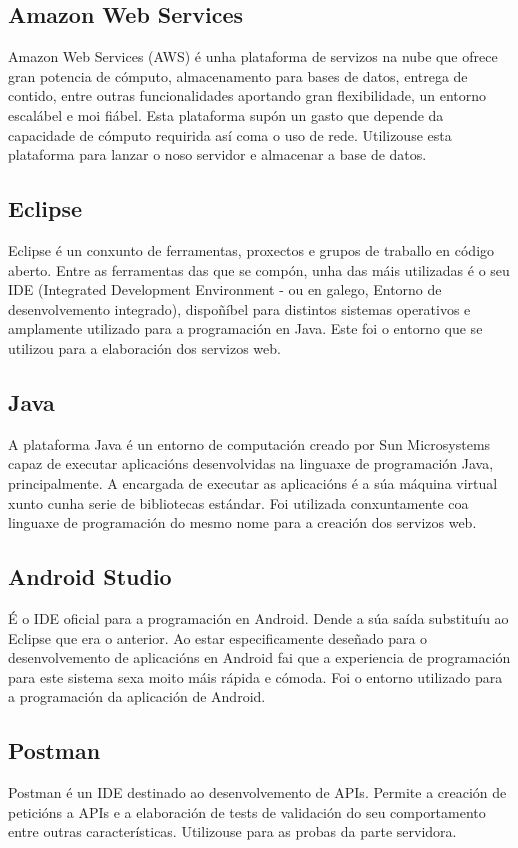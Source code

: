 \subsection{Amazon Web Services}
Amazon Web Services (AWS) é unha plataforma de servizos na nube que ofrece gran potencia de cómputo, almacenamento para bases de datos, entrega de contido, entre outras funcionalidades aportando gran flexibilidade, un entorno escalábel e moi fiábel. Esta plataforma supón un gasto que depende da capacidade de cómputo requirida así coma o uso de rede. Utilizouse esta plataforma para lanzar o noso servidor e almacenar a base de datos.


\subsection{Eclipse}
Eclipse é un conxunto de ferramentas, proxectos e grupos de traballo en código aberto. Entre as ferramentas das que se compón, unha das máis utilizadas é o seu IDE (Integrated Development Environment - ou en galego, Entorno de desenvolvemento integrado), dispoñíbel para distintos sistemas operativos e amplamente utilizado para a programación en Java. Este foi o entorno que se utilizou para a elaboración dos servizos web.


\subsection{Java}
A plataforma Java é un entorno de computación creado por Sun Microsystems capaz de executar aplicacións desenvolvidas na linguaxe de programación Java, principalmente. A encargada de executar as aplicacións é a súa máquina virtual xunto cunha serie de bibliotecas estándar. Foi utilizada conxuntamente coa linguaxe de programación do mesmo nome para a creación dos servizos web.


\subsection{Android Studio}
É o IDE oficial para a programación en Android. Dende a súa saída substituíu ao Eclipse que era o anterior. Ao estar especificamente deseñado para o desenvolvemento de aplicacións en Android fai que a experiencia de programación para este sistema sexa moito máis rápida e cómoda. Foi o entorno utilizado para a programación da aplicación de Android.


\subsection{Postman}
Postman é un IDE destinado ao desenvolvemento de APIs. Permite a creación de peticións a APIs e a elaboración de tests de validación do seu comportamento entre outras características. Utilizouse para as probas da parte servidora.



